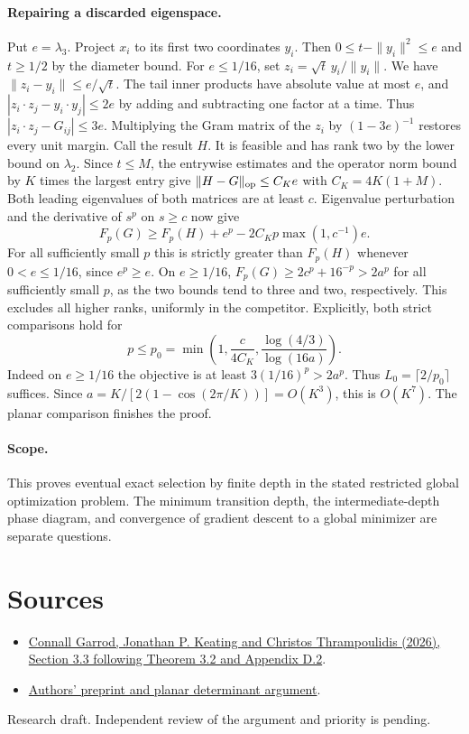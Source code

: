 \documentclass[10pt]{article}
\begin{document}
\paragraph{Repairing a discarded eigenspace.} Put $e=\lambda_3$. Project $x_i$ to its first two coordinates $y_i$. Then $0\le t-\|y_i\|^2\le e$ and $t\ge1/2$ by the diameter bound. For $e\le1/16$, set $z_i=\sqrt t\, y_i/\|y_i\|$. We have $\|z_i-y_i\|\le e/\sqrt t$. The tail inner products have absolute value at most $e$, and
$|z_i\cdot z_j-y_i\cdot y_j|\le2e$ by adding and subtracting one factor at a time. Thus $|z_i\cdot z_j-G_{ij}|\le3e$. Multiplying the Gram matrix of the $z_i$ by $(1-3e)^{-1}$ restores every unit margin. Call the result $H$. It is feasible and has rank two by the lower bound on $\lambda_2$. Since $t\le M$, the entrywise estimates and the operator norm bound by $K$ times the largest entry give $\|H-G\|_{\rm op}\le C_K e$ with $C_K=4K(1+M)$. Both leading eigenvalues of both matrices are at least $c$. Eigenvalue perturbation and the derivative of $s^p$ on $s\ge c$ now give
\[
 F_p(G)\ge F_p(H)+e^p-2 C_K p\max(1,c^{-1})e.
\]
For all sufficiently small $p$ this is strictly greater than $F_p(H)$ whenever $0<e\le1/16$, since $e^p\ge e$. On $e\ge1/16$, $F_p(G)\ge2c^p+16^{-p}>2a^p$ for all sufficiently small $p$, as the two bounds tend to three and two, respectively. This excludes all higher ranks, uniformly in the competitor. Explicitly, both strict comparisons hold for
\[
 p\le p_0=\min\left(1,\frac{c}{4 C_K},\frac{\log(4/3)}{\log(16a)}\right).
\]
Indeed on $e\ge1/16$ the objective is at least $3(1/16)^p>2a^p$. Thus $L_0=\lceil 2/p_0\rceil$ suffices. Since $a=K/[2(1-\cos(2\pi/K))]=O(K^3)$, this is $O(K^7)$. The planar comparison finishes the proof.

\paragraph{Scope.} This proves eventual exact selection by finite depth in the stated restricted global optimization problem. The minimum transition depth, the intermediate-depth phase diagram, and convergence of gradient descent to a global minimizer are separate questions.

\section*{Sources}
\begin{itemize}
\item \href{https://proceedings.mlr.press/v306/garrod26a.html}{Connall Garrod, Jonathan P. Keating and Christos Thrampoulidis (2026), Section 3.3 following Theorem 3.2 and Appendix D.2}.
\item \href{https://arxiv.org/abs/2605.23087}{Authors' preprint and planar determinant argument}.
\end{itemize}
{\small Research draft. Independent review of the argument and priority is pending.}
\end{document}
